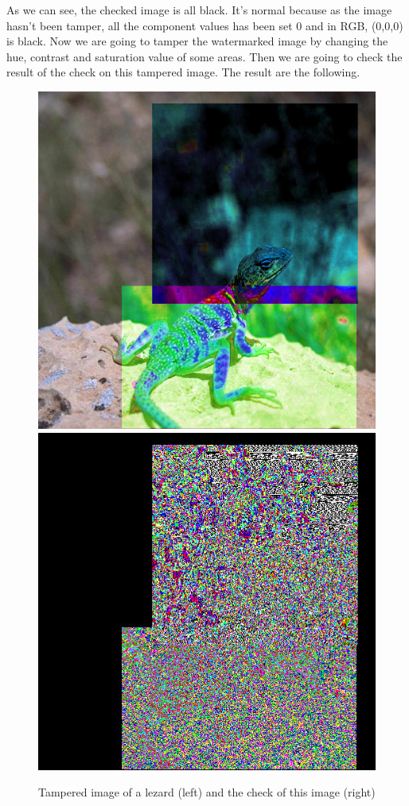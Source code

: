 \documentclass[11pt, oneside]{article}   	%
\begin{document}
			As we can see, the checked image is all black. It's normal because as the image hasn't been tamper, all the component values has been set 0 and in RGB, (0,0,0) is black.
			\newline
			Now we are going to tamper the watermarked image by changing the hue, contrast and saturation value of some areas. Then we are going to check the result of the check on this tampered image. The result are the following.	
			\begin{figure}[h]
			\begin{center}
				\includegraphics[scale=0.342]{images_png/image6.jpg}
				\includegraphics[scale=0.342]{images_png/image7.jpg}
			\end{center}
			\caption{Tampered image of a lezard (left) and the check of this image (right)}
			\end{figure}
	
\end{document}
